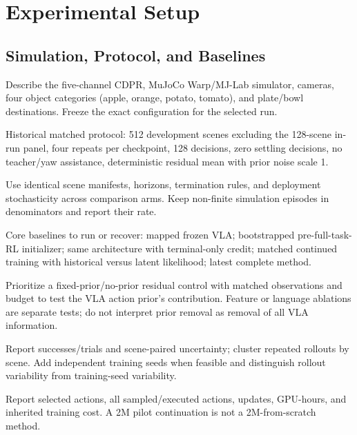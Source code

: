 \section{Experimental Setup}\label{sec:setup}
\subsection{Simulation, Protocol, and Baselines}
\begin{outline}
\item Describe the five-channel CDPR, MuJoCo Warp/MJ-Lab simulator, cameras, four object categories (apple, orange, potato, tomato), and plate/bowl destinations. Freeze the exact configuration for the selected run.
\item Historical matched protocol: 512 development scenes excluding the 128-scene in-run panel, four repeats per checkpoint, 128 decisions, zero settling decisions, no teacher/yaw assistance, deterministic residual mean with prior noise scale 1.
\item Use identical scene manifests, horizons, termination rules, and deployment stochasticity across comparison arms. Keep non-finite simulation episodes in denominators and report their rate.
\item Core baselines to run or recover: mapped frozen VLA; bootstrapped pre-full-task-RL initializer; same architecture with terminal-only credit; matched continued training with historical versus latent likelihood; latest complete method.
\item Prioritize a fixed-prior/no-prior residual control with matched observations and budget to test the VLA action prior's contribution. Feature or language ablations are separate tests; do not interpret prior removal as removal of all VLA information.
\item Report successes/trials and scene-paired uncertainty; cluster repeated rollouts by scene. Add independent training seeds when feasible and distinguish rollout variability from training-seed variability.
\item Report selected actions, all sampled/executed actions, updates, GPU-hours, and inherited training cost. A 2M pilot continuation is not a 2M-from-scratch method.
\end{outline}
